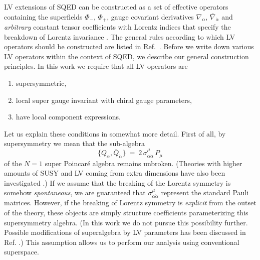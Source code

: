 \documentclass[12pt]{revtex4}
\begin{document}
LV extensions of SQED can be constructed as a set of effective
operators containing the superfields $\Phi_-$, $\Phi_+$,
gauge covariant derivatives $ \nabla_\alpha $, 
$ \overline{\nabla}_{\dot\alpha} $ and {\em arbitrary} constant tensor
coefficients with Lorentz indices  that specify the
breakdown of Lorentz invariance \cite{GrootNibbelink:2004za}. 
The general rules according to which LV operators should be
constructed are listed in Ref.\ \cite{MP:}. Before we write down various
LV operators within the context of SQED, we
describe our general construction principles. In this work we require
that all LV operators are  
\begin{enumerate}
\item supersymmetric, 
\item local super gauge invariant with chiral gauge parameters, 
\item have local component expressions. 
\end{enumerate}
Let us explain these conditions in somewhat more detail. First of all,
by supersymmetry we mean that the sub-algebra 
%
\begin{equation}
\{ Q_\alpha, \overline{Q}_{\dot\alpha} \} ~=~ 
2\, \sigma^\mu_{\alpha\dot{\alpha}} \, P_\mu
\end{equation}
%
of the $N=1$ super Poincar\'e algebra remains unbroken. (Theories with
higher amounts of SUSY and LV coming from extra dimensions have also
been investigated  \cite{Ney:2004tn,Ney:2005gb,Ney:2005wc}.)
If we assume that the breaking of the Lorentz symmetry is somehow 
{\em spontaneous}, we are guaranteed that
$\sigma^\mu_{\alpha\dot{\alpha}}$ represent the standard Pauli
matrices. However, if the breaking of Lorentz symmetry is {\em
explicit} from the outset of the theory, these objects are simply 
structure coefficients parameterizing this supersymmetry algebra. (In
this work we do not pursue this possibility further. Possible
modifications of superalgebra by LV parameters has been discussed in
Ref. \cite{Berger:,Berger:2003ay}.) This assumption allows us to perform our
analysis using conventional superspace.  
\end{document}

